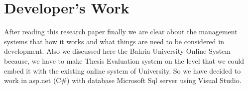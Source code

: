 \section{Developer's Work}

After reading this research paper finally we are clear about the management systems that how it works and what things are need to be considered in development. Also we discussed here the Bahria University Online System because, we have to make Thesis Evaluation system on the level that we could embed it with the existing online system of University. So we have decided to work in asp.net (C#) with database Microsoft Sql server using Visual Studio.




